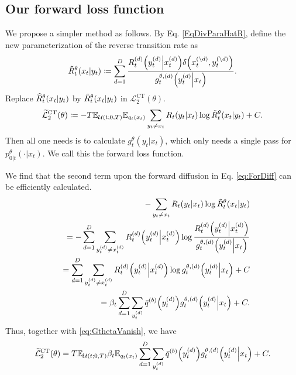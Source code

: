 \documentclass{article}
\begin{document}
\subsection{Our forward loss function}
We propose a simpler method as follows. By Eq. \eqref{EqDivParaHatR}, define the new parameterization of the reverse transition rate as
\begin{eqnarray}
  \tilde{R}^\theta_t\qty(x_t\middle|y_t)\coloneq\sum_{d=1}^D \frac{R^{(d)}_t\qty(y^{(d)}_t\middle| x^{(d)}_t)\delta\qty(x^{(\setminus d)}_t ,y^{(\setminus d)}_t)}{g^{\theta,(d)}_t\qty(y^{(d)}_t\middle|x_t)}.
\end{eqnarray}
Replace $\widehat{R}^\theta_t\qty(x_t\middle|y_t)$ by $\tilde{R}^\theta_t\qty(x_t\middle|y_t)$ in $\mathcal{L}_2^\text{CT}(\theta)$.
\begin{eqnarray}\label{EqBetterNgELBO}
  \widetilde{\mathcal{L}}_2^\text{CT}(\theta)\coloneq -T\mathbb{E}_{\mathcal{U}(t;0,T)}\mathbb{E}_{q_t\qty(x_t)}\sum_{y_t\neq x_t}R_t\qty(y_t\middle|x_t)\log\tilde{R}_t^\theta\qty(x_t\middle|y_t) + C.
\end{eqnarray}
Then all one needs is to calculate $g^\theta_t(y_t|x_t)$, which only needs a single pass for $p^\theta_{0|t}(\cdot|x_t)$. We call this the forward loss function.

We find that the second term upon the forward diffusion in Eq. \eqref{eq:ForDiff} can be efficiently calculated.
\begin{eqnarray*}
  &&- \sum_{y_t\neq x_t}R_t\qty(y_t\middle|x_t)\log\tilde{R}_t^\theta\qty(x_t\middle|y_t)\\
  &&=-\sum_{d=1}^D\sum_{y^{(d)}_t\neq x^{(d)}_t}R^{(d)}_t\qty(y^{(d)}_t\middle|x^{(d)}_t)\log\frac{R_t^{(d)}\qty(y^{(d)}_t\middle|x^{(d)}_t)}{g^{\theta,(d)}_t\qty(y^{(d)}_t\middle|x_t)}\\
  &&=\sum_{d=1}^D\sum_{y^{(d)}_t\neq x^{(d)}_t}R^{(d)}_t\qty(y^{(d)}_t\middle|x^{(d)}_t)\log g^{\theta,(d)}_t\qty(y^{(d)}_t\middle|x_t) + C\\
  &&=\beta_t\sum_{d=1}^D\sum_{y^{(d)}_t}\bar{q}^{(b)}\qty(y^{(d)}_t) g^{\theta,(d)}_t\qty(y^{(d)}_t\middle|x_t) + C.
\end{eqnarray*}
Thus, together with \eqref{eq:GthetaVanish}, we have
\begin{eqnarray}\label{eq:ELBOforward}
  \widetilde{\mathcal{L}}_2^\text{CT}(\theta)=T\mathbb{E}_{\mathcal{U}(t;0,T)}\beta_t\mathbb{E}_{q_t\qty(x_t)}\sum_{d=1}^D\sum_{y^{(d)}_t}\bar{q}^{(b)}\qty(y^{(d)}_t) g^{\theta,(d)}_t\qty(y^{(d)}_t\middle|x_t) + C.
\end{eqnarray}
\end{document}
